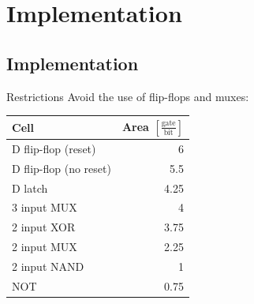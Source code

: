 \documentclass[svgnames]{beamer}
\begin{document}

\section{Implementation}
\subsection*{Implementation}
\begin{frame}{Restrictions}
Avoid the use of flip-flops and muxes:

	\begin{center}
	\begin{tabular}{lr}
		\toprule
		Cell							& Area $\left[\frac{\text{gate}}{\text{bit}}\right]$\\
		\midrule
		D flip-flop (reset)		& 6\\
		D flip-flop (no reset)	& 5.5\\
		D latch						& 4.25\\
		3 input MUX					& 4\\
		2 input XOR					& 3.75\\
		2 input MUX					& 2.25\\
		2 input NAND				& 1\\
		NOT							& 0.75\\
		\bottomrule
	\end{tabular}
	\end{center}
\end{frame}
\end{document}
